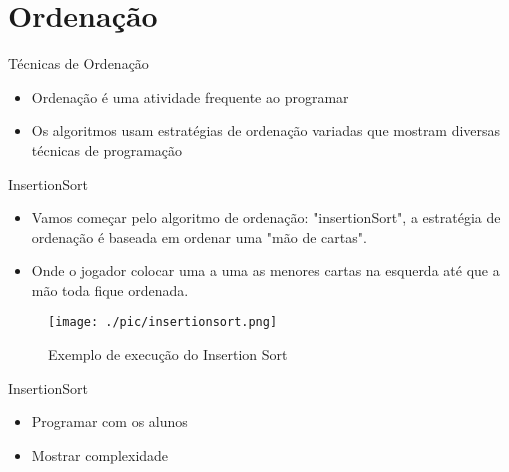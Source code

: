 \section{Ordenação}

\begin{frame}
	\begin{block}{Técnicas de Ordenação}
		\begin{itemize}
			\item Ordenação é uma atividade frequente ao programar
			
			\item Os algoritmos usam estratégias de ordenação variadas que mostram diversas técnicas de programação
		\end{itemize}
	\end{block}
\end{frame}


\begin{frame}
	\begin{block}{InsertionSort}
		\begin{itemize}
			\item Vamos começar pelo algoritmo de ordenação: "insertionSort", a estratégia de ordenação é baseada em ordenar uma "mão de cartas". 

			\item Onde o jogador colocar uma a uma as menores cartas na esquerda até que a mão toda fique ordenada.
		\end{itemize}
	\end{block}
\end{frame}

\begin{frame}	
	\begin{block}{}	
		 \begin{figure}[!htb]
			\centering	  				
			\texttt{[image: ./pic/insertionsort.png]}
			\caption{Exemplo de execução do Insertion Sort \cite{GEEKS_2018}}
			\label{fig_analise_insertion}
		\end{figure}
	\end{block}
\end{frame}

\begin{frame}
	\begin{block}{InsertionSort}
		\begin{itemize}
			\item Programar com os alunos
			\item Mostrar complexidade
		\end{itemize}
	\end{block}
\end{frame}


